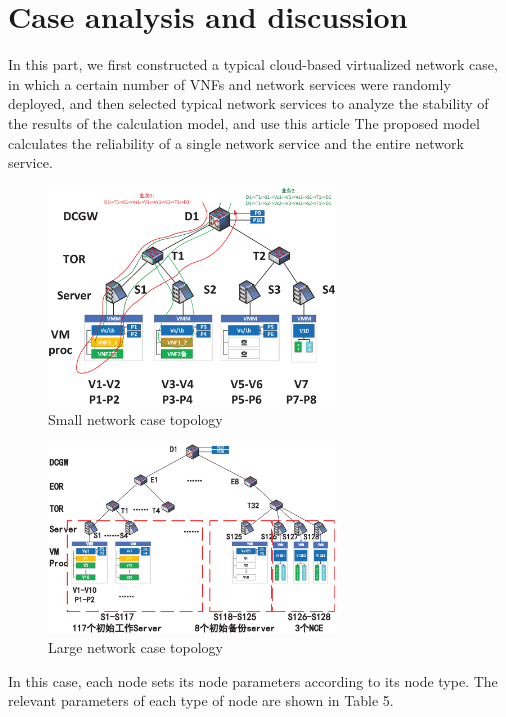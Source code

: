 \documentclass[journal]{IEEEtran}
\begin{document}
    \section{Case analysis and discussion}
    In this part, we first constructed a typical cloud-based virtualized network case, in which a certain number of VNFs and network services were randomly deployed, and then selected typical network services to analyze the stability of the results of the calculation model, and use this article The proposed model calculates the reliability of a single network service and the entire network service.

    \begin{figure}[!t]
        \begin{center}
            \includegraphics[width = 3in]{img/11.eps}
            \caption{Small network case topology}
            \label{fig10}
        \end{center}
    \end{figure}

    \begin{figure}[!t]
        \begin{center}
            \includegraphics[width = 3in]{img/10.eps}
            \caption{Large network case topology}
            \label{fig11}
        \end{center}
    \end{figure}

    In this case, each node sets its node parameters according to its node type. The relevant parameters of each type of node are shown in Table 5.
\end{document}
